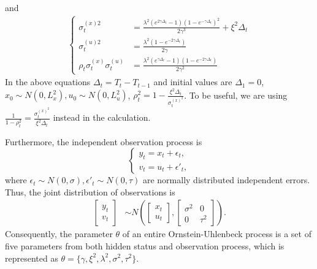 and 
\begin{align*}
\begin{cases}
\sigma_t^{(x)2} &=\frac{\lambda^2 \left(e^{2 \gamma\Delta_t}-1\right) \left(1 -e^{-\gamma\Delta_t}\right)^2}{2 \gamma ^3 } + \xi^2\Delta_t\\
\sigma_t^{(u)2} &= \frac{\lambda ^2 \left(1- e^{-2 \gamma\Delta_t}\right)}{2 \gamma } \\
\rho_t\sigma_t^{(x)}\sigma_t^{(u)} & =\frac{\lambda ^2 \left(e^{\gamma\Delta_t} -1\right) \left(1-e^{-2\gamma\Delta_t}\right)}{2 \gamma ^2}
\end{cases}
\end{align*}
In the above equations $\Delta_t = T_t-T_{t-1}$ and initial values are $\Delta_1=0$, $x_0\sim N(0,L_x^2), u_0\sim N(0,L_u^2)$, $\rho_t^2 = 1-\frac{\xi^2 \Delta_t}{\sigma_t^{(x)^2}}$. To be useful, we are using $\frac{1}{1-\rho_t^2} =\frac{\sigma_t^{(x)^2}}{\xi^2 \Delta_t}$ instead in the calculation. 

Furthermore, the independent observation process is 
\begin{equation}\label{obseq}
\begin{cases} y_t=x_t+\epsilon_t,\\ v_t=u_t+\epsilon'_t, \end{cases} 
\end{equation}
where $\epsilon_t\sim N(0,\sigma),\epsilon'_t\sim N(0,\tau)$ are normally distributed independent errors. Thus, the joint distribution of observations is 
\begin{align}\label{obmodel}
\begin{bmatrix} y_t \\ v_t \end{bmatrix} &\sim N\left(
\begin{bmatrix}x_t \\ u_t \end{bmatrix} , 
\begin{bmatrix}
\sigma^2 & 0\\
0 & \tau^2
\end{bmatrix} \right).
\end{align}
Consequently, the parameter $\theta$ of an entire Ornstein-Uhlenbeck process is a set of five parameters from both hidden status and observation process, which is represented as $\theta = \{\gamma,\xi^2,\lambda^2,\sigma^2,\tau^2 \}$. 


